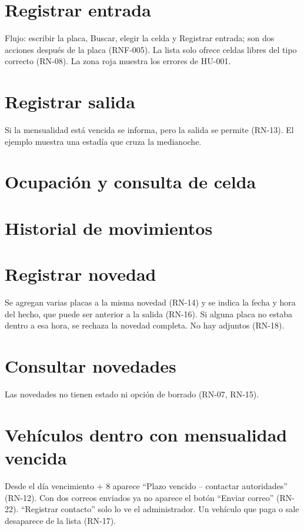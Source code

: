 \section{Registrar entrada}
Flujo: escribir la placa, Buscar, elegir la celda y Registrar entrada; son dos acciones después de la placa (RNF-005). La lista solo ofrece celdas libres del tipo correcto (RN-08). La zona roja muestra los errores de HU-001.

\section{Registrar salida}
Si la mensualidad está vencida se informa, pero la salida se permite (RN-13). El ejemplo muestra una estadía que cruza la medianoche.

\section{Ocupación y consulta de celda}

\section{Historial de movimientos}

\section{Registrar novedad}
Se agregan varias placas a la misma novedad (RN-14) y se indica la fecha y hora del hecho, que puede ser anterior a la salida (RN-16). Si alguna placa no estaba dentro a esa hora, se rechaza la novedad completa. No hay adjuntos (RN-18).

\section{Consultar novedades}
Las novedades no tienen estado ni opción de borrado (RN-07, RN-15).

\section{Vehículos dentro con mensualidad vencida}
Desde el día vencimiento + 8 aparece ``Plazo vencido -- contactar autoridades'' (RN-12). Con dos correos enviados ya no aparece el botón ``Enviar correo'' (RN-22). ``Registrar contacto'' solo lo ve el administrador. Un vehículo que paga o sale desaparece de la lista (RN-17).

